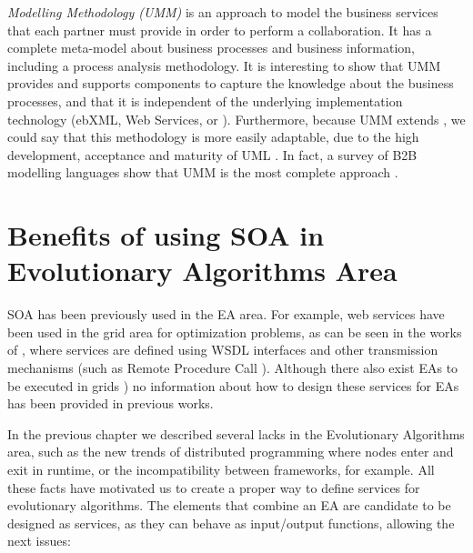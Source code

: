 {\em {} Modelling Methodology (UMM)} \cite{Hofreiter06UMM} is an approach to model the business services that each partner must provide in order to perform a  collaboration. It has a complete meta-model about business processes and business information, including a process analysis methodology. It is interesting to show that UMM provides and supports components to capture the knowledge about the business processes, and that it is independent of the underlying implementation technology (ebXML, Web Services,  or ). Furthermore, because UMM extends , we could say that this methodology is more easily adaptable, due to the high development, acceptance and maturity of UML \cite{Garcia09UMM}. In fact, a survey of B2B modelling languages show that UMM is the most complete approach \cite{Folmer08b2b}.

\section{Benefits of using SOA in Evolutionary Algorithms Area}

\lettrine{S}{OA} has been previously used in the EA area. For example, web services have been used in the grid area for optimization problems, as can be seen in the works of \cite{grid1,grid2,grid3,grid5}, where services are defined using WSDL interfaces and other transmission mechanisms (such as Remote Procedure Call \citep{grid6,grid7}). Although there also exist EAs to be executed in grids \citep{grid8,grid4,grid10}) no information about how to design these services for EAs has been provided in previous works. 

In the previous chapter we described several lacks in the Evolutionary Algorithms area, such as the new trends of distributed programming where nodes enter and exit in runtime, or the incompatibility between frameworks, for example. All these facts have motivated us to create a proper way to define services for evolutionary algorithms. The elements that combine an EA are candidate to be designed as services, as they can behave as input/output functions, allowing the next issues:  

